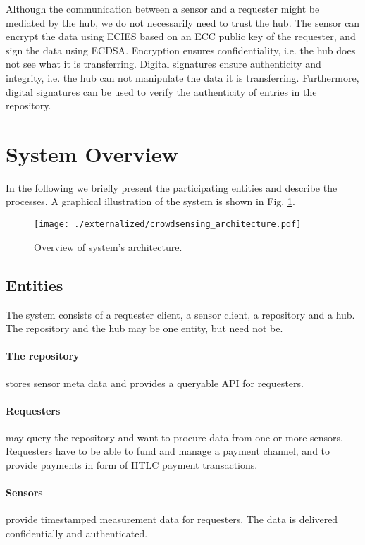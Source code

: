 Although the communication between a sensor and a requester might be mediated by the hub, we do not necessarily need to trust the hub. The sensor can encrypt the data using \ac{ECIES} based on an \ac{ECC} public key of the requester, and sign the data using \ac{ECDSA}. Encryption ensures confidentiality, i.e. the hub does not see what it is transferring. Digital signatures ensure authenticity and integrity, i.e. the hub can not manipulate the data it is transferring. 
Furthermore, digital signatures can be used to verify the authenticity of entries in the repository.

\section{System Overview}
\label{sec:trustlessoverview}

In the following we briefly present the participating entities and describe the processes. A graphical illustration of the system is shown in Fig. \ref{fig:architecture}.

 \begin{figure}
 \texttt{[image: ./externalized/crowdsensing\_architecture.pdf]}
 \caption{Overview of system's architecture.}
 \label{fig:architecture}
 \end{figure}

\subsection{Entities}

The system consists of a requester client, a sensor client, a repository and a hub. The repository and the hub may be one entity, but need not be. 

\paragraph{The repository} stores sensor meta data and provides a queryable \ac{API} for requesters.

\paragraph{Requesters} may query the repository and want to procure data from one or more sensors. Requesters have to be able to fund and manage a payment channel, and to provide payments in form of \ac{HTLC} payment transactions.

\paragraph{Sensors} provide timestamped measurement data for requesters. The data is delivered confidentially and authenticated.

